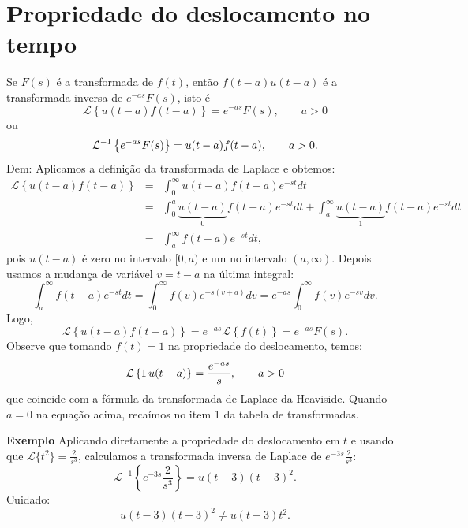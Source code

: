 \documentclass[a4paper,10pt]{book}
\begin{document}
 \section{Propriedade do deslocamento no tempo}
% 
   Se $F(s)$ é a transformada de $f(t)$, então $f(t-a)u(t-a)$ é a transformada inversa de $e^{-as}F(s)$, isto é
 \begin{equation}
 \mathcal{L}\left\{u(t-a)f(t-a)\right\} =e^{-as}F(s),\qquad a>0
 \end{equation}
 ou
 \begin{equation}{\label{eq_trans_t_inv}}
 \mathcal{L}^{-1} \left\{e^{-as}F(s)\right\} =u(t-a)f(t-a),\qquad a>0.
 \end{equation} 
%  
 Dem: Aplicamos a definição da transformada de Laplace e obtemos:
  \begin{eqnarray*}
  \mathcal{L}\left\{u(t-a)f(t-a)\right\}&=&\int_0^\infty u(t-a)f(t-a)e^{-st}dt\\
  &=&\int_0^a \underbrace{u(t-a)}_{0}f(t-a)e^{-st}dt+\int_a^\infty \underbrace{u(t-a)}_{1}f(t-a)e^{-st}dt\\
  &=&\int_a^\infty f(t-a)e^{-st}dt,
  \end{eqnarray*}
  pois $u(t-a)$ é zero no intervalo $[0,a)$ e um no intervalo $(a,\infty)$. Depois usamos a mudança de variável $v=t-a$ na última integral:
  \begin{equation*}
  \int_a^\infty f(t-a)e^{-st}dt=\int_0^\infty f(v)e^{-s(v+a)}dv=e^{-as}\int_0^\infty f(v)e^{-sv}dv.
  \end{equation*}
  Logo,
  \begin{equation}
  \mathcal{L}\left\{u(t-a)f(t-a)\right\}=e^{-as}\mathcal{L}\left\{f(t)\right\}=e^{-as}F(s).
  \end{equation}
% 
  Observe que tomando $f(t)=1$ na propriedade do deslocamento, temos:
  \begin{equation}{\label{Heaviside_trans_1}}
  \mathcal{L}\left\{1~\!u(t-a)\right\} =\frac{e^{-as}}{s},\qquad a>0
  \end{equation}
  que coincide com a fórmula da transformada de Laplace da Heaviside. %
  Quando $a=0$ na equação acima, recaímos no item 1 da tabela de transformadas.
 
  

{\bf Exemplo} Aplicando diretamente a propriedade do deslocamento em $t$ e usando que $\mathcal{L}\{t^2\}=\frac{2}{s^3}$, calculamos a transformada inversa de Laplace de $e^{-3s}\frac{2}{s^3}$:
  \begin{equation}
  \mathcal{L}^{-1}\left\{e^{-3s}\frac{2}{s^3}\right\}=u(t-3)(t-3)^2.
  \end{equation}
Cuidado:
  \begin{equation}
  u(t-3)(t-3)^2 \neq u(t-3)t^2.
  \end{equation}
\end{document}
